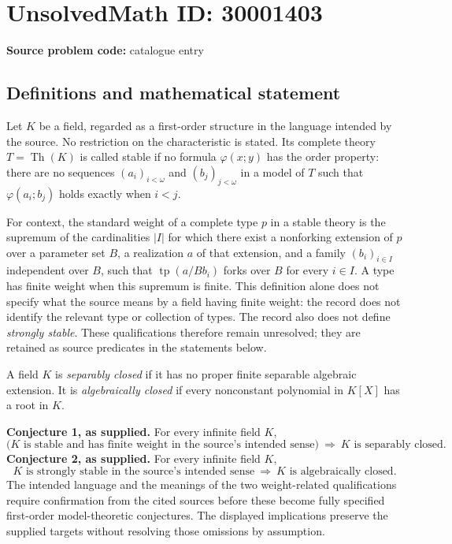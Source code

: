 \documentclass[11pt]{article}
\begin{document}
\section*{UnsolvedMath ID: 30001403}
\textbf{Source problem code:} catalogue entry
\subsection{Definitions and mathematical statement}
Let \(K\) be a field, regarded as a first-order structure in the language intended by the source. No restriction on the characteristic is stated. Its complete theory \(T=\operatorname{Th}(K)\) is called stable if no formula \(\varphi(x;y)\) has the order property: there are no sequences \((a_i)_{i<\omega}\) and \((b_j)_{j<\omega}\) in a model of \(T\) such that \(\varphi(a_i;b_j)\) holds exactly when \(i<j\).

For context, the standard weight of a complete type \(p\) in a stable theory is the supremum of the cardinalities \(|I|\) for which there exist a nonforking extension of \(p\) over a parameter set \(B\), a realization \(a\) of that extension, and a family \((b_i)_{i\in I}\) independent over \(B\), such that \(\operatorname{tp}(a/Bb_i)\) forks over \(B\) for every \(i\in I\). A type has finite weight when this supremum is finite. This definition alone does not specify what the source means by a field having finite weight: the record does not identify the relevant type or collection of types. The record also does not define \emph{strongly stable}. These qualifications therefore remain unresolved; they are retained as source predicates in the statements below.

A field \(K\) is \emph{separably closed} if it has no proper finite separable algebraic extension. It is \emph{algebraically closed} if every nonconstant polynomial in \(K[X]\) has a root in \(K\).

\textbf{Conjecture 1, as supplied.} For every infinite field \(K\),
\[
\bigl(K\text{ is stable and has finite weight in the source's intended sense}\bigr)
\ \Longrightarrow\ K\text{ is separably closed}.
\]
\textbf{Conjecture 2, as supplied.} For every infinite field \(K\),
\[
K\text{ is strongly stable in the source's intended sense}
\ \Longrightarrow\ K\text{ is algebraically closed}.
\]
The intended language and the meanings of the two weight-related qualifications require confirmation from the cited sources before these become fully specified first-order model-theoretic conjectures. The displayed implications preserve the supplied targets without resolving those omissions by assumption.
\end{document}
